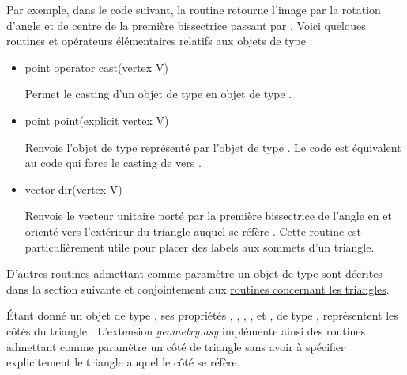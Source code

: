 \documentclass[pdftex]{article}
\newcommand{\Geo}{L'extension \emph{geometry.asy}\xspace}
\begin{document}
Par exemple, dans le code suivant, la routine
\hypertarget{bisectorvertex}{%
  }%
 retourne l'image par la rotation
d'angle  et de centre  de la première
bissectrice passant par .
Voici quelques routines et opérateurs élémentaires relatifs aux
objets de type :
\begin{itemize}
\item {}
  \begin{Vcolor}
    point operator cast(vertex V)
  \end{Vcolor}
  Permet le \og{}casting\fg{} d'un objet de type  en
  objet de type .
\item {}
  \begin{Vcolor}
    point point(explicit vertex V)
  \end{Vcolor}
  Renvoie l'objet de type  représenté par
  l'objet  de type . Le code  est
  équivalent au code  qui force le \og{}casting\fg{} de
   vers .
\item {}
  \begin{Vcolor}
    vector dir(vertex V)
  \end{Vcolor}
  Renvoie le vecteur unitaire porté par la première bissectrice de
  l'angle en  et orienté vers l'extérieur du triangle auquel
  se réfère . Cette routine est particulièrement utile pour
  placer des labels aux sommets d'un triangle.
\end{itemize}
D'autres routines admettant comme paramètre un objet de type
 sont décrites dans la section suivante et conjointement
aux \href{#subsection.routines}{routines concernant les triangles}.

Étant donné un objet  de type , ses propriétés
, , , , 
et , de type ,
représentent les côtés du triangle . \Geo implémente ainsi
des routines admettant comme paramètre un côté de triangle sans avoir
à spécifier explicitement le triangle auquel le côté se réfère.
\end{document}
